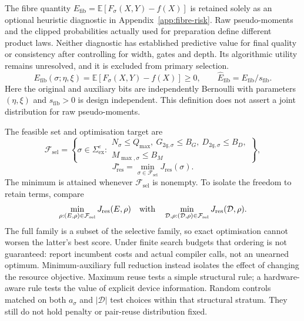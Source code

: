 \documentclass[a4paper,onecolumn,11pt,unpublished]{quantumarticle}
\theoremstyle{remark}
\begin{document}
The fibre quantity $E_{\mathrm{fib}}=\mathbb E[F_\sigma(X,Y)-f(X)]$ is retained solely as an optional heuristic diagnostic in Appendix~\ref{app:fibre-risk}. Raw pseudo-moments and the clipped probabilities actually used for preparation define different product laws. Neither diagnostic has established predictive value for final quality or consistency after controlling for width, gates and depth. Its algorithmic utility remains unresolved, and it is excluded from primary selection.
\begin{equation}
E_{\mathrm{fib}}(\sigma;\eta,\xi)=\mathbb E[F_\sigma(X,Y)-f(X)]\geq0,
\qquad \widehat E_{\mathrm{fib}}=E_{\mathrm{fib}}/s_{\mathrm{fib}}.
\label{eq:fibre-excess-short}
\end{equation}
Here the original and auxiliary bits are independently Bernoulli with parameters $(\eta,\xi)$ and $s_{\mathrm{fib}}>0$ is design independent. This definition does not assert a joint distribution for raw pseudo-moments.

The feasible set and optimisation target are
\begin{equation}
\mathcal F_{\mathrm{sel}}=\left\{\sigma\in\Sigma_{\mathrm{ex}}^\varepsilon:
\begin{array}{c}
N_\sigma\leq Q_{\max},\ G_{2q,\sigma}\leq B_G,\ D_{2q,\sigma}\leq B_D,\\
M_{\max,\sigma}\leq B_M
\end{array}\right\},
\label{eq:selection-feasible-set}
\end{equation}
\begin{equation}
J_{\mathrm{res}}^\star=\min_{\sigma\in\mathcal F_{\mathrm{sel}}}J_{\mathrm{res}}(\sigma).
\label{eq:selection-problem}
\end{equation}
The minimum is attained whenever $\mathcal F_{\mathrm{sel}}$ is nonempty.
To isolate the freedom to retain terms, compare
\begin{equation}
\min_{\rho:(E,\rho)\in\mathcal F_{\mathrm{sel}}}J_{\mathrm{res}}(E,\rho)
\quad\hbox{with}\quad
\min_{\mathcal D,\rho:(\mathcal D,\rho)\in\mathcal F_{\mathrm{sel}}}J_{\mathrm{res}}(\mathcal D,\rho).
\label{eq:fair-full-comparison}
\end{equation}
The full family is a subset of the selective family, so exact optimisation cannot worsen the latter's best score. Under finite search budgets that ordering is not guaranteed: report incumbent costs and actual compiler calls, not an unearned optimum. Minimum-auxiliary full reduction instead isolates the effect of changing the resource objective. Maximum reuse tests a simple structural rule; a hardware-aware rule tests the value of explicit device information. Random controls matched on both $a_\sigma$ and $|\mathcal D|$ test choices within that structural stratum. They still do not hold penalty or pair-reuse distribution fixed.
\end{document}
